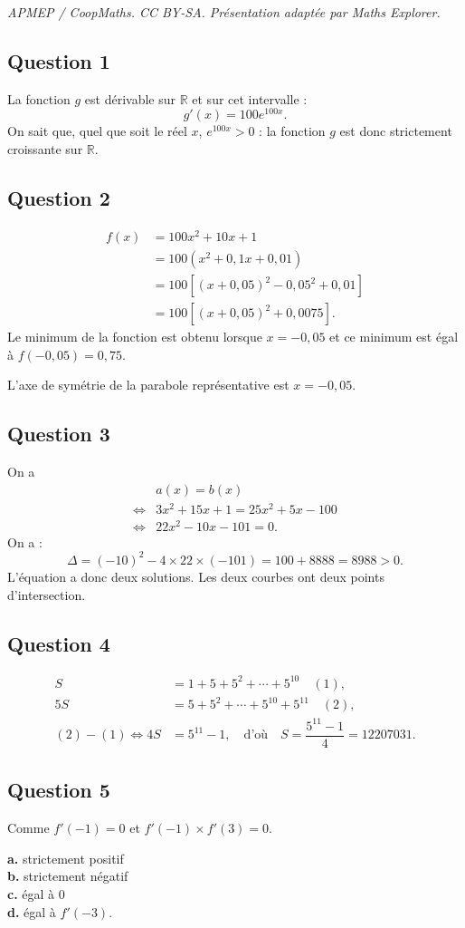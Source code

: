 \documentclass[10pt]{article}
\begin{document}
\noindent\textit{APMEP / CoopMaths. CC BY-SA. Présentation adaptée par Maths Explorer.}\par\medskip
\subsection*{Question 1}
	La fonction \( g \) est dérivable sur \( \mathbb{R} \) et sur cet intervalle :
	\[
	g'(x) = 100 e^{100x}.
	\]
	On sait que, quel que soit le réel \( x \), \( e^{100x} > 0 \) : la fonction \( g \) est donc strictement croissante sur \( \mathbb{R} \).
	
	\subsection*{Question 2}
\begin{align*}
	f(x) &= 100x^2 + 10x + 1\\
	& = 100 \left( x^2 + 0,1x + 0,01 \right)\\
	&= 100 \left[ (x + 0,05)^2 - 0,05^2 + 0,01 \right]\\
	& = 100 \left[ (x + 0,05)^2 + 0,0075 \right].
\end{align*}
	Le minimum de la fonction est obtenu lorsque \( x = -0,05 \) et ce minimum est égal à \( f(-0,05) = 0,75 \).
	
	L'axe de symétrie de la parabole représentative est \( x = -0,05 \).
	
	\subsection*{Question 3}
	On a 
\begin{align*}
	&a(x) = b(x)\\
	 \iff &3x^2 + 15x + 1 = 25x^2 + 5x - 100\\
	  \iff&22x^2 - 10x - 101 = 0.
\end{align*}
	On a :
	\[
	\Delta = (-10)^2 - 4 \times 22 \times (-101) = 100 + 8888 = 8988 > 0.
	\]
	L'équation a donc deux solutions. Les deux courbes ont deux points d'intersection.
	
	\subsection*{Question 4}
	\begin{align*}
		S &= 1 + 5 + 5^2 + \cdots + 5^{10} \quad (1), \\
		5S &= 5 + 5^2 + \cdots + 5^{10} + 5^{11} \quad (2), \\
		(2) - (1) \iff 4S &= 5^{11} - 1, \quad \text{d'où} \quad S = \dfrac{5^{11} - 1}{4} = 12207031.
	\end{align*}
	
	\subsection*{Question 5}
	Comme \( f'(-1) = 0 \) et \( f'(-1) \times f'(3) = 0 \).
	
	\medskip
	\textbf{a.} strictement positif \\
	\textbf{b.} strictement négatif \\
	\textbf{c.} égal à 0 \\
	\textbf{d.} égal à \( f'(-3) \).
\end{document}
